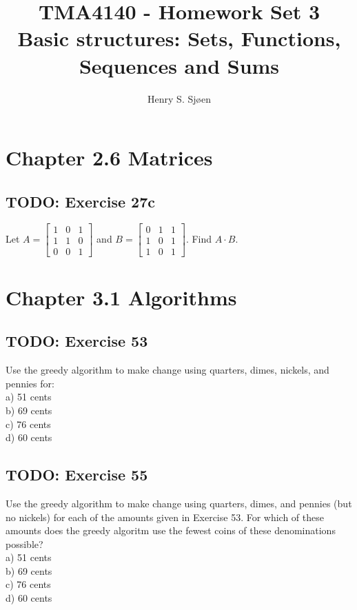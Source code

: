 \documentclass[12pt]{article}
\author{Henry S. Sjøen}
\title{
  \textbf{TMA4140 - Homework Set 3}\\
  Basic structures: Sets, Functions, Sequences and Sums\\
    \color{darkred}{\textbf{RETTES}}
  }
\begin{document}
    \maketitle 
    \thispagestyle{empty}
    \tableofcontents
      
    \pagebreak
    \section{Chapter 2.6 Matrices}
    \subsection{TODO: Exercise 27c}
    Let
    $ A = 
        \begin{bmatrix}
          1 & 0 & 1 \\
          1 & 1 & 0 \\
          0 & 0 & 1
        \end{bmatrix}
    $ 
    and
    $  
    B =
        \begin{bmatrix}
            0&1&1\\
            1&0&1\\
            1&0&1
        \end{bmatrix}
    $. Find $A \cdot B$.
    
    \pagebreak
    \section{Chapter 3.1 Algorithms}
    \subsection{TODO: Exercise 53  }
    Use the greedy algorithm to make change using quarters, dimes, nickels, and pennies for:\\
    a) 51 cents \\
    b) 69 cents \\
    c) 76 cents \\
    d) 60 cents

    \subsection{TODO: Exercise 55 }
    Use the greedy algorithm to make change using quarters, dimes, and pennies (but no nickels) for each of the amounts given in Exercise 53. For which of these amounts does the greedy algoritm use the fewest coins of these denominations possible?\\
    a) 51 cents \\
    b) 69 cents \\
    c) 76 cents \\
    d) 60 cents
\end{document}
